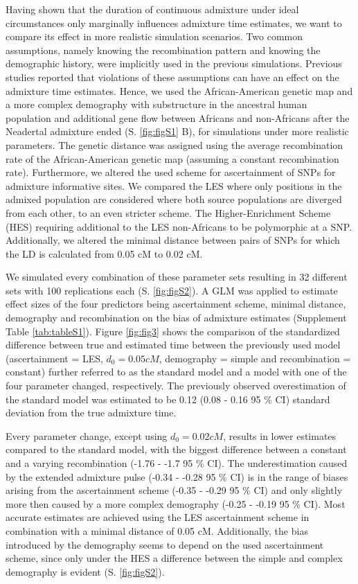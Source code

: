 \documentclass[]{article}
\begin{document}
Having shown that the duration of continuous admixture under ideal
circumstances only marginally influences admixture time
estimates, we want to compare its effect in more realistic simulation scenarios. Two common assumptions, namely knowing the recombination pattern and knowing the demographic history, were implicitly used in the previous simulations.
Previous studies reported that violations of these assumptions can have an effect on the admixture time estimates.
Hence, we used the African-American genetic map and a more complex demography with substructure in the ancestral human population and additional gene flow between Africans and non-Africans after the Neadertal admixture ended (S. \ref{fig:figS1} B), for simulations under more realistic parameters. The genetic distance was assigned using the average recombination rate of the African-American genetic map (assuming a constant recombination rate).
Furthermore, we altered the used scheme for ascertainment of SNPs for admixture informative sites. We compared the LES where only
positions in the admixed population are considered where both source
populations are diverged from each other, to an even stricter scheme. The Higher-Enrichment Scheme (HES) requiring additional
to the LES non-Africans to be polymorphic at a SNP. Additionally, we altered the minimal distance between pairs of SNPs for which the LD is calculated from 0.05 cM to 0.02 cM.



We simulated every combination of these parameter sets resulting in 32
different sets with 100 replications each (S. \ref{fig:figS2}).
A GLM was applied to estimate effect sizes of the four predictors being
ascertainment scheme, minimal distance, demography and recombination on
the bias of admixture estimates (Supplement Table \ref{tab:tableS1}).
Figure \ref{fig:fig3} shows the comparison of the standardized
difference between true and estimated time between the previously used
model (ascertainment = LES, \(d_{0} = 0.05 cM\), demography = simple and
recombination = constant) further referred to as the standard model and
a model with one of the four parameter changed, respectively. The
previously observed overestimation of the standard model was estimated
to be 0.12 (0.08 - 0.16 95 \% CI) standard deviation from the true
admixture time.

Every parameter change, except using \(d_{0} = 0.02 cM\), results in lower estimates compared to the
standard model, with the biggest difference between a constant and a
varying recombination (-1.76 - -1.7 95 \% CI). The
underestimation caused by the extended admixture pulse (-0.34 -
-0.28 95 \% CI) is in the range of biases arising from the ascertainment scheme (-0.35 -
-0.29 95 \% CI) and only slightly more then caused by a more complex demography (-0.25 -
-0.19 95 \% CI). Most accurate estimates are achieved using the LES
ascertainment scheme in combination with a minimal distance of 0.05 cM.
Additionally, the bias introduced by the demography seems to depend on
the used ascertainment scheme, since only under the HES a difference
between the simple and complex demography is evident (S.
\ref{fig:figS2}).
\end{document}
